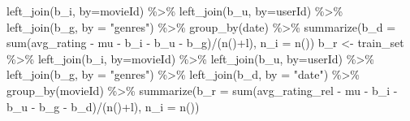 \documentclass[
]{article}
\newenvironment{Shaded}{}{}
\newcommand{\AttributeTok}[1]{\textcolor[rgb]{0.49,0.56,0.16}{#1}}
\newcommand{\FunctionTok}[1]{\textcolor[rgb]{0.02,0.16,0.49}{#1}}
\newcommand{\NormalTok}[1]{#1}
\newcommand{\OtherTok}[1]{\textcolor[rgb]{0.00,0.44,0.13}{#1}}
\newcommand{\SpecialCharTok}[1]{\textcolor[rgb]{0.25,0.44,0.63}{#1}}
\newcommand{\StringTok}[1]{\textcolor[rgb]{0.25,0.44,0.63}{#1}}
\begin{document}
\begin{Shaded}
\begin{Highlighting}[]
    \FunctionTok{left\_join}\NormalTok{(b\_i, }\AttributeTok{by=}\StringTok{\textquotesingle{}movieId\textquotesingle{}}\NormalTok{) }\SpecialCharTok{\%\textgreater{}\%}
    \FunctionTok{left\_join}\NormalTok{(b\_u, }\AttributeTok{by=}\StringTok{\textquotesingle{}userId\textquotesingle{}}\NormalTok{) }\SpecialCharTok{\%\textgreater{}\%} 
    \FunctionTok{left\_join}\NormalTok{(b\_g, }\AttributeTok{by =} \StringTok{"genres"}\NormalTok{) }\SpecialCharTok{\%\textgreater{}\%} 
    \FunctionTok{group\_by}\NormalTok{(date) }\SpecialCharTok{\%\textgreater{}\%} 
    \FunctionTok{summarize}\NormalTok{(}\AttributeTok{b\_d =} \FunctionTok{sum}\NormalTok{(avg\_rating }\SpecialCharTok{{-}}\NormalTok{ mu }\SpecialCharTok{{-}}\NormalTok{ b\_i }\SpecialCharTok{{-}}\NormalTok{ b\_u }\SpecialCharTok{{-}}\NormalTok{ b\_g)}\SpecialCharTok{/}\NormalTok{(}\FunctionTok{n}\NormalTok{()}\SpecialCharTok{+}\NormalTok{l), }\AttributeTok{n\_i =} \FunctionTok{n}\NormalTok{())}
\NormalTok{  b\_r }\OtherTok{\textless{}{-}}\NormalTok{ train\_set }\SpecialCharTok{\%\textgreater{}\%}
    \FunctionTok{left\_join}\NormalTok{(b\_i, }\AttributeTok{by=}\StringTok{\textquotesingle{}movieId\textquotesingle{}}\NormalTok{) }\SpecialCharTok{\%\textgreater{}\%}
    \FunctionTok{left\_join}\NormalTok{(b\_u, }\AttributeTok{by=}\StringTok{\textquotesingle{}userId\textquotesingle{}}\NormalTok{) }\SpecialCharTok{\%\textgreater{}\%} 
    \FunctionTok{left\_join}\NormalTok{(b\_g, }\AttributeTok{by =} \StringTok{"genres"}\NormalTok{) }\SpecialCharTok{\%\textgreater{}\%} 
    \FunctionTok{left\_join}\NormalTok{(b\_d, }\AttributeTok{by =} \StringTok{"date"}\NormalTok{) }\SpecialCharTok{\%\textgreater{}\%} 
    \FunctionTok{group\_by}\NormalTok{(movieId) }\SpecialCharTok{\%\textgreater{}\%} 
    \FunctionTok{summarize}\NormalTok{(}\AttributeTok{b\_r =} \FunctionTok{sum}\NormalTok{(avg\_rating\_rel }\SpecialCharTok{{-}}\NormalTok{ mu }\SpecialCharTok{{-}}\NormalTok{ b\_i }\SpecialCharTok{{-}}\NormalTok{ b\_u }\SpecialCharTok{{-}}\NormalTok{ b\_g }\SpecialCharTok{{-}}\NormalTok{ b\_d)}\SpecialCharTok{/}\NormalTok{(}\FunctionTok{n}\NormalTok{()}\SpecialCharTok{+}\NormalTok{l), }\AttributeTok{n\_i =} \FunctionTok{n}\NormalTok{())}


\end{Highlighting}
\end{Shaded}
\end{document}
